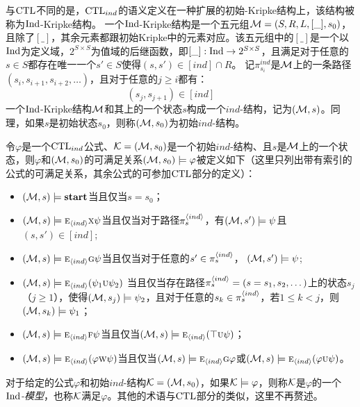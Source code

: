 与$\textrm{CTL}$不同的是，$\textrm{CTL}_{ind}$的语义定义在一种扩展的初始-Kripke结构上，该结构被称为$\textrm{Ind}$-Kripke结构。
一个$\textrm{Ind}$-Kripke结构是一个五元组${\cal M}=(S,R,L,[\_],s_0)$，且除了$[\_]$，其余元素都跟初始Kripke中的元素对应。该五元组中的$[\_]$是一个以$\textrm{Ind}$为定义域，$2^{S\times S}$为值域的后继函数，即$[\_]:\textrm{Ind} \rightarrow 2^{S\times S}$，且满足对于任意的$s\in S$都存在唯一一个$s'\in S$使得$(s,s')\in [ind]\cap R$。
记$\pi_{s_i}^{ind}$是${\cal M}$上的一条路径$(s_i,s_{i+1},s_{i+2},\dots)$，且对于任意的$j\ge i$都有：
\[
(s_j,s_{j+1}) \in [ind] \qquad 
\]
一个$\textrm{Ind}$-Kripke结构${\cal M}$和其上的一个状态$s$构成一个$ind$-结构，记为$({\cal M},s)$。同理，如果$s$是初始状态$s_0$，则称$({\cal M},s_0)$为初始$ind$-结构。

令$\varphi$是一个$\textrm{CTL}_{ind}$公式、${\cal K}=({\cal M},s_0)$是一个初始$ind$-结构、且$s$是${\cal M}$上的一个状态，则$\varphi$和$({\cal M},s_0)$的可满足关系$({\cal M},s_0)\models \varphi$被定义如下（这里只列出带有索引的公式的可满足关系，其余公式的可参加$\textrm{CTL}$部分的定义）：
\begin{itemize}
	\item $({\cal M},s) \models \textbf{start}$当且仅当$s=s_0$；
	\item $({\cal M},s)\models \textsc{e}_{{\langle{ind}\rangle}} \textsc{x} \psi$当且仅当对于路径$\pi_{s}^{{\langle{ind}\rangle}}$，有$({\cal M}, s')\models \psi$且$(s, s') \in [ind]$;
	\item $({\cal M},s)\models \textsc{e}_{{\langle{ind}\rangle}}\textsc{g}\psi$当且仅当对于任意的$s' \in  \pi_{s}^{{\langle{ind}\rangle}}$，%
	$({\cal M},s') \models \psi$;
	\item $({\cal M},s)\models \textsc{e}_{{\langle{ind}\rangle}}(\psi_1\textsc{u}\psi_2)$
	当且仅当存在路径$\pi_{s}^{{\langle{ind}\rangle}} = (s=s_1, s_2, \dots)$上的状态$s_j$（$j\ge 1$），使得$({\cal M},s_j) \models \psi_2$，且对于任意的$s_k \in \pi_{s}^{{\langle{ind}\rangle}}$，若$1\leq k < j$，则$({\cal M},s_k) \models \psi_1$；
	\item $({\cal M},s) \models \textsc{e}_{{\langle{ind}\rangle}} \textsc{f} \psi$当且仅当$({\cal M},s) \models \textsc{e}_{{\langle{ind}\rangle}}(\top \textsc{u}\psi)$；
	\item $({\cal M},s)\models \textsc{e}_{{\langle{ind}\rangle}}(\varphi\textsc{w}\psi)$当且仅当$({\cal M},s) \models \textsc{e}_{{\langle{ind}\rangle}}\textsc{g} \varphi$或$({\cal M},s)\models \textsc{e}_{{\langle{ind}\rangle}}(\varphi\textsc{u}\psi)$。
\end{itemize}

对于给定的公式$\varphi$和初始$ind$-结构${\cal K}=({\cal M},s_0)$，如果${\cal K} \models \varphi$，则称${\cal K}$是$\varphi$的一个\emph{$\textrm{Ind}$-模型}，也称${\cal K}$满足$\varphi$。其他的术语与$\textrm{CTL}$部分的类似，这里不再赘述。

